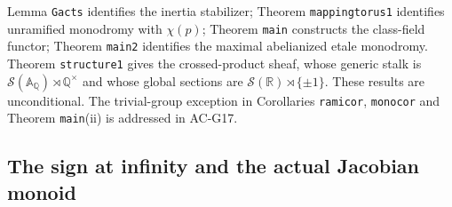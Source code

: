 \begin{itemize}
Lemma \texttt{Gacts} identifies the inertia stabilizer; Theorem
\texttt{mappingtorus1} identifies unramified monodromy with
$\chi(p)$; Theorem \texttt{main} constructs the class-field functor;
Theorem \texttt{main2} identifies the maximal abelianized
etale monodromy.  Theorem \texttt{structure1} gives the crossed-product
sheaf, whose generic stalk is
$\mathcal S(\mathbb A_{\mathbb Q})\rtimes\mathbb Q^\times$ and whose
global sections are $\mathcal S(\mathbb R)\rtimes\{\pm1\}$.
These results are unconditional.  The trivial-group exception in
Corollaries \texttt{ramicor}, \texttt{monocor} and Theorem
\texttt{main}(ii) is addressed in AC-G17.
\end{itemize}

\subsection{The sign at infinity and the actual Jacobian monoid}

